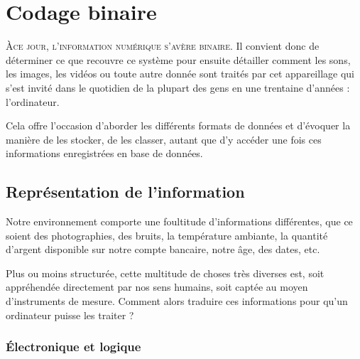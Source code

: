 \chapter[Codage binaire]{Codage binaire}
\label{chap:V}

\vspace{-6pt}

\lettrine{À}{ce jour, l'information numérique s'avère binaire}. Il convient donc de déterminer ce que recouvre ce système pour ensuite détailler comment les sons, les images, les vidéos ou toute autre donnée sont traités par cet appareillage qui s'est invité dans le quotidien de la plupart des gens en une trentaine d'années : l'ordinateur.

Cela offre l'occasion d'aborder les différents formats de données et d'évoquer la manière de les stocker, de les classer, autant que d'y accéder une fois ces informations enregistrées en base de données.


\section[Représentation de l'information]{Représentation de l'information}
\label{sec:V.1}

Notre environnement comporte une foultitude d'informations différentes, que ce soient des photographies, des bruits, la température ambiante, la quantité d'argent disponible sur notre compte bancaire, notre âge, des dates, etc.

Plus ou moins structurée, cette multitude de choses très diverses est, soit appréhendée directement par nos sens humains, soit captée au moyen d'instruments de mesure. Comment alors traduire ces informations pour qu'un ordinateur puisse les traiter ? 


\subsection[Électronique et logique]{Électronique et logique}
\label{sub:V.1.1}

